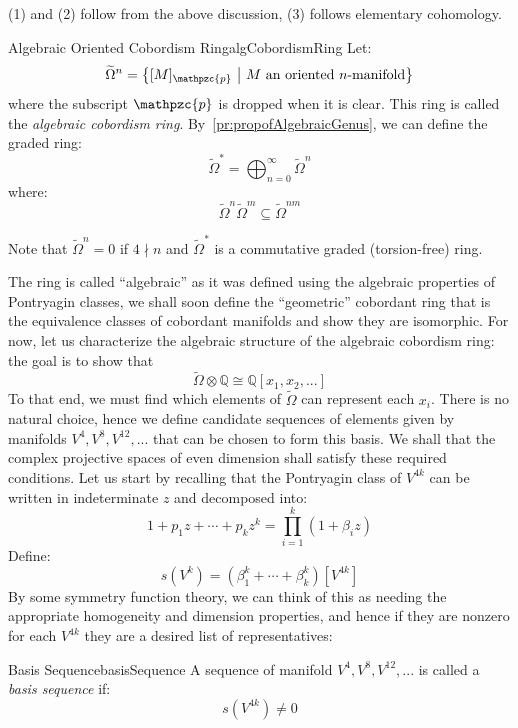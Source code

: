 \documentclass{ut-thesis}
\newenvironment{Proof}[1][]
  {\begin{ProofTcb}[#1]}
  {\end{ProofTcb}}
\newcommand{\Q}{{\mathbb{Q}}}
\newcommand{\cp}{{\mathpzc{p}}}
\newcommand{\sse}{\subseteq}
\newcommand{\set}[2]{\left\{#1 \ \middle|\ #2\right\}}
\begin{document}
\begin{Proof}
  (1) and (2) follow from the above discussion, (3) follows elementary cohomology.
\end{Proof}


\begin{defn}{Algebraic Oriented Cobordism Ring}{algCobordismRing}
  Let:
  \[
    \widetilde{\Omega}^n = \set{[M]_\cp}{\text{$M$ an oriented $n$-manifold}}
  \]
  where the subscript $\cp$ is dropped when it is clear. This ring is called the \emph{algebraic cobordism
  ring}. By~\cref{pr:propofAlgebraicGenus}, we can define the
  graded ring:
  \[
    \widetilde{\Omega}^* = \bigoplus_{n=0}^\infty \widetilde{\Omega}^n
  \]
  where:
  \[
    \widetilde{\Omega}^n \widetilde{\Omega}^m \sse \widetilde{\Omega}^{nm}
  \]
\end{defn}

Note that $\widetilde{\Omega}^n = 0$ if $4\nmid n$ and $\widetilde{\Omega}^*$ is a commutative graded (torsion-free)
ring.

The ring is called ``algebraic'' as it was defined using the algebraic properties of Pontryagin classes, we
shall soon define the ``geometric'' cobordant ring that is the equivalence classes of cobordant manifolds and
show they are isomorphic. For now, let us characterize the algebraic structure of the algebraic cobordism
ring: the goal is to show that
\[
  \widetilde{\Omega}\otimes \Q \cong \Q[x_1, x_2, ...]
\]
To that end, we must find which elements of $\widetilde{\Omega}$ can represent each $x_i$. There is no natural
choice, hence we define candidate sequences of elements given by manifolds $V^4, V^8, V^{12}, ...$ that
can be chosen to form this basis. We shall that the complex projective spaces of even
dimension shall satisfy these required conditions. Let us start by recalling that the Pontryagin class of $V^{4k}$ can be written in indeterminate $z$
and decomposed into:
\[
  1 + p_1z + \cdots + p_kz^k = \prod_{i=1}^k (1 + \beta_iz)
\]
Define:
\[
  s(V^k) = (\beta_1^k + \cdots + \beta_k^k)[V^{4k}]
\]
By some symmetry function theory, we can think of this as needing the appropriate homogeneity and dimension
properties, and hence if they are nonzero for each $V^{4k}$ they are a desired list of representatives:
\begin{defn}{Basis Sequence}{basisSequence}
  A sequence of manifold $V^4, V^8, V^{12}, ...$ is called a \emph{basis sequence} if:
  \[
    s(V^{4k}) \ne 0
  \]
\end{defn}
\end{document}

